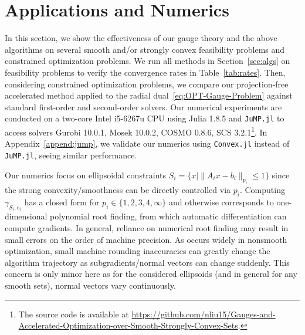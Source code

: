 \documentclass[sn-mathphys,Numbered]{sn-jnl}%
\begin{document}






\section{Applications and Numerics}\label{sec:appli}
In this section, we show the effectiveness of our gauge theory and the above algorithms on several smooth and/or strongly convex feasibility problems and constrained optimization problems. We run all methods in Section~\ref{sec:algs} on feasibility problems to verify the convergence rates in Table~\ref{tab:rates}. Then, considering constrained optimization problems, we compare our projection-free accelerated method applied to the radial dual~\eqref{eq:OPT-Gauge-Problem} against standard first-order and second-order solvers. Our numerical experiments are conducted on a two-core Intel i5-6267u CPU using Julia 1.8.5 and \texttt{JuMP.jl} to access solvers Gurobi 10.0.1, Mosek 10.0.2, COSMO 0.8.6, SCS 3.2.1\footnote{The source code is available at \url{https://github.com/nliu15/Gauges-and-Accelerated-Optimization-over-Smooth-Strongly-Convex-Sets}.}. In Appendix~\ref{append:jump}, we validate our numerics using \texttt{Convex.jl} instead of \texttt{JuMP.jl}, seeing similar performance.

Our numerics focus on ellipsoidal constraints $S_i=\{x \mid \|A_ix - b_i\|_{p_i}\leq 1\}$ since the strong convexity/smoothness can be directly controlled via $p_i$. Computing $\gamma_{S_i,e_i}$ has a closed form for $p_i\in\{1,2,3,4,\infty\}$ and otherwise corresponds to one-dimensional polynomial root finding, from which automatic differentiation can compute gradients. In general, reliance on numerical root finding may result in small errors on the order of machine precision. As occurs widely in nonsmooth optimization, small machine rounding inaccuracies can greatly change the algorithm trajectory as subgradients/normal vectors can change suddenly. This concern is only minor here as for the considered ellipsoids (and in general for any smooth sets), normal vectors vary continuously. 
\end{document}
